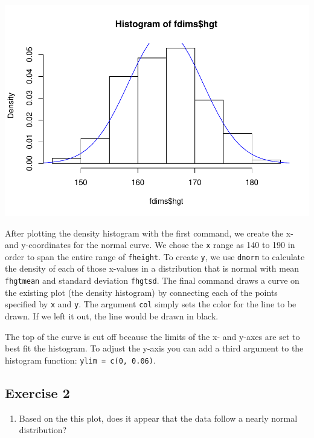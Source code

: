 \documentclass[]{article}
\providecommand{\tightlist}{%
  \setlength{\itemsep}{0pt}\setlength{\parskip}{0pt}}
\begin{document}
\includegraphics{Lab_3_files/figure-latex/hist-height-1.pdf}

After plotting the density histogram with the first command, we create
the x- and y-coordinates for the normal curve. We chose the \texttt{x}
range as 140 to 190 in order to span the entire range of
\texttt{fheight}. To create \texttt{y}, we use \texttt{dnorm} to
calculate the density of each of those x-values in a distribution that
is normal with mean \texttt{fhgtmean} and standard deviation
\texttt{fhgtsd}. The final command draws a curve on the existing plot
(the density histogram) by connecting each of the points specified by
\texttt{x} and \texttt{y}. The argument \texttt{col} simply sets the
color for the line to be drawn. If we left it out, the line would be
drawn in black.

The top of the curve is cut off because the limits of the x- and y-axes
are set to best fit the histogram. To adjust the y-axis you can add a
third argument to the histogram function: \texttt{ylim\ =\ c(0,\ 0.06)}.

\subsection{Exercise 2}\label{exercise-2}

\begin{enumerate}
\def\labelenumi{\arabic{enumi}.}
\setcounter{enumi}{1}
\tightlist
\item
  Based on the this plot, does it appear that the data follow a nearly
  normal distribution?
\end{enumerate}
\end{document}

